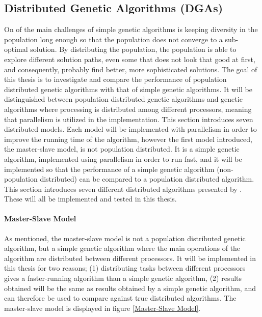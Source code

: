 \subsection{Distributed Genetic Algorithms (DGAs)}\label{subsection:dga}
On of the main challenges of simple genetic algorithms is keeping diversity in the population long enough so that the population does not converge to a sub-optimal solution. By distributing the population, the population is able to explore different solution paths, even some that does not look that good at first, and consequently, probably find better, more sophisticated solutions. The goal of this thesis is to investigate and compare the performance of population distributed genetic algorithms with that of simple genetic algorithms. It will be distinguished between population distributed genetic algorithms and genetic algorithms where processing is distributed among different processors, meaning that parallelism is utilized in the implementation. This section introduces seven distributed models. Each model will be implemented with parallelism in order to improve the running time of the algorithm, however the first model introduced, the master-slave model, is not population distributed. It is a simple genetic algorithm, implemented using parallelism in order to run fast, and it will be implemented so that the performance of a simple genetic algorithm (non-population distributed) can be compared to a population distributed algorithm. This section introduces seven different distributed algorithms presented by \cite{Gong}. These will all be implemented and tested in this thesis.\\


\paragraph*{Master-Slave Model}
As mentioned, the master-slave model is not a population distributed genetic algorithm, but a simple genetic algorithm where the main operations of the algorithm are distributed between different processors. It will be implemented in this thesis for two reasons; (1) distributing tasks between different processors gives a faster-running algorithm than a simple genetic algorithm, (2) results obtained will be the same as results obtained by a simple genetic algorithm, and can therefore be used to compare against true distributed algorithms. The master-slave model is displayed in figure \ref{Master-Slave Model}.\\


